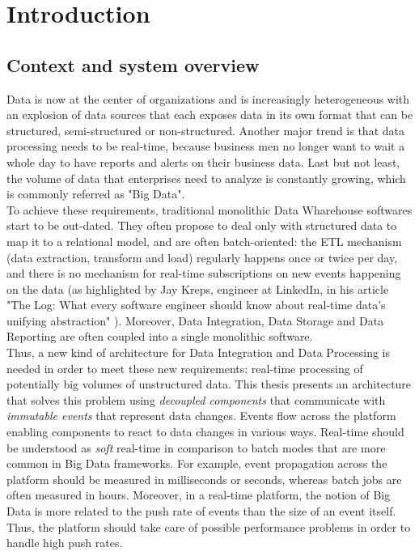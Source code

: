 \chapter{Introduction}

\section{Context and system overview}

Data is now at the center of organizations and is increasingly heterogeneous with an explosion of data sources 
that each exposes data in its own format that can be structured, semi-structured or non-structured.
Another major trend is that data processing needs to be real-time, because business men no longer want to wait a whole day 
to have reports and alerts on their business data. Last but not least, the volume of data that enterprises need to analyze is constantly growing, which is commonly referred as "Big Data".
\\

To achieve these requirements, traditional monolithic Data Wharehouse softwares start to be out-dated. They often
propose to deal only with structured data to map it to a relational model, and are often batch-oriented: 
the ETL mechanism (data extraction, transform and load) regularly happens once or twice per day, and there is no mechanism 
for real-time subscriptions on new events happening on the data (as highlighted by Jay Kreps, engineer at LinkedIn, 
in his article "The Log: What every software engineer should know about real-time data's unifying abstraction" ). Moreover,
Data Integration, Data Storage and Data Reporting are often coupled into a single monolithic software.
\\

Thus, a new kind of architecture for Data Integration and Data Processing is needed in order to meet these new requirements: real-time processing of potentially big volumes of unstructured data. This thesis presents an architecture that solves this problem using \textit{decoupled components} that communicate with \textit{immutable events} that represent data changes. Events flow across the platform enabling components to react to data changes in various ways. Real-time should be understood as \textit{soft} real-time in comparison to batch modes that are more common in Big Data frameworks. For example, event propagation across the platform should be measured in milliseconds or seconds, whereas batch jobs are often measured in hours. Moreover, in a real-time platform, the notion of Big Data is more related to the push rate of events than the size of an event itself. Thus, the platform should take care of possible performance problems in order to handle high push rates.

